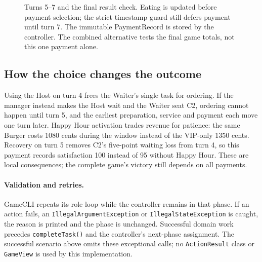 \begin{landscape}
\begin{figure}[p]
{}
\caption{Turns 5--7 and the final result check. Eating is updated before payment selection; the strict timestamp guard still defers payment until turn 7. The immutable PaymentRecord is stored by the controller. The combined alternative tests the final game totals, not this one payment alone.}
\label{fig:seq3}
\end{figure}
\end{landscape}
\clearpage
\subsection{How the choice changes the outcome}
Using the Host on turn 4 frees the Waiter's single task for ordering. If the
manager instead makes the Host wait and the Waiter seat C2, ordering cannot
happen until turn 5, and the earliest preparation, service and payment each move
one turn later. Happy Hour activation trades revenue for patience: the same
Burger costs 1080 cents during the window instead of the VIP-only 1350 cents.
Recovery on turn 5 removes C2's five-point waiting loss from turn 4, so this
payment records satisfaction 100 instead of 95 without Happy Hour. These are
local consequences; the complete game's victory still depends on all payments.

\paragraph{Validation and retries.} GameCLI repeats its role loop while the
controller remains in that phase. If an action fails, an
\texttt{IllegalArgumentException} or \texttt{IllegalStateException} is caught,
the reason is printed and the phase is unchanged. Successful domain work precedes
\texttt{completeTask()} and the controller's next-phase assignment. The successful
scenario above omits these exceptional calls; no \texttt{ActionResult} class or
\texttt{GameView} is used by this implementation.
